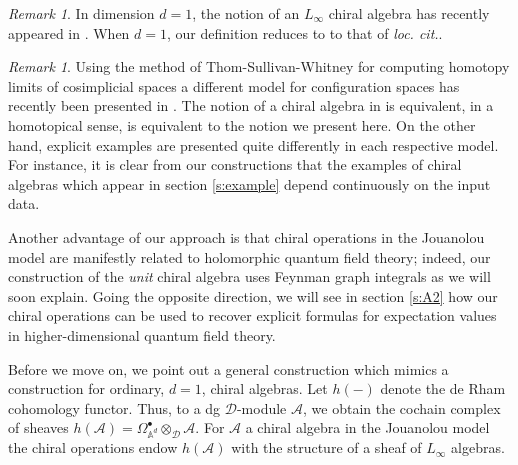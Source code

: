\documentclass[11pt]{amsart}
\theoremstyle{definition}
\theoremstyle{remark}
\newtheorem{rem}[thm]{Remark}
\numberwithin{equation}{section}
\newcommand{\bu}{\bullet}
\newcommand{\cA}{\mathcal{A}}
\begin{document}
\begin{rem}
  In dimension $d=1$, the notion of an $L_\infty$ chiral algebra has recently appeared in \cite{SVhtpy}.
  When $d=1$, our definition reduces to to that of \textit{loc. cit.}.
\end{rem}

\begin{rem}
  Using the method of Thom-Sullivan-Whitney for computing homotopy limits of cosimplicial spaces a different model for
  configuration spaces has recently been presented in \cite{FGY}.
  The notion of a chiral algebra in \cite{FGY} is equivalent, in a homotopical sense, is equivalent to the notion we
  present here.
  On the other hand, explicit examples are presented quite differently in each respective model.
  For instance, it is clear from our constructions that the examples of chiral algebras which appear in section
  \ref{s:example} depend continuously on the input data.
  
  Another advantage of our approach is that chiral operations in the Jouanolou model are manifestly related to
  holomorphic quantum field theory; indeed, our construction of the \textit{unit} chiral algebra uses Feynman graph
  integrals as we will soon explain.
  Going the opposite direction, we will see in section \ref{s:A2} how our chiral operations can be used to recover
  explicit formulas for expectation values in higher-dimensional quantum field theory.
\end{rem}

Before we move on, we point out a general construction which mimics a construction for ordinary, $d=1$, chiral
algebras.
Let $h(-)$ denote the de Rham cohomology functor.
Thus, to a dg $\mathcal{D}$-module $\mathcal{A}$, we obtain the cochain complex of sheaves $h(\mathcal{A}) = \Omega^\bu_{\mathbb{A}^d}
\otimes_{\mathcal{\mathcal{D}}} \cA$.
For $\mathcal{A}$ a chiral algebra in the Jouanolou model the chiral operations endow $h(\mathcal{A})$ with
the structure of a sheaf of $L_\infty$ algebras.
\end{document}
